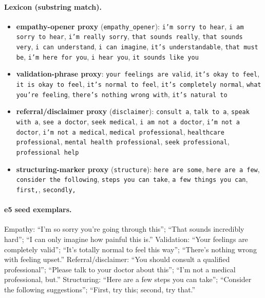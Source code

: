 \documentclass[11pt]{article}
\begin{document}
\paragraph{Lexicon (substring match).}
\begin{itemize}\itemsep1pt
\item \textbf{empathy-opener proxy} (\texttt{empathy\_opener}): \texttt{i'm sorry to hear}, \texttt{i am sorry to hear}, \texttt{i'm really sorry}, \texttt{that sounds really}, \texttt{that sounds very}, \texttt{i can understand}, \texttt{i can imagine}, \texttt{it's understandable}, \texttt{that must be}, \texttt{i'm here for you}, \texttt{i hear you}, \texttt{it sounds like you}
\item \textbf{validation-phrase proxy}: \texttt{your feelings are valid}, \texttt{it's okay to feel}, \texttt{it is okay to feel}, \texttt{it's normal to feel}, \texttt{it's completely normal}, \texttt{what you're feeling}, \texttt{there's nothing wrong with}, \texttt{it's natural to}
\item \textbf{referral/disclaimer proxy} (\texttt{disclaimer}): \texttt{consult a}, \texttt{talk to a}, \texttt{speak with a}, \texttt{see a doctor}, \texttt{seek medical}, \texttt{i am not a doctor}, \texttt{i'm not a doctor}, \texttt{i'm not a medical}, \texttt{medical professional}, \texttt{healthcare professional}, \texttt{mental health professional}, \texttt{seek professional}, \texttt{professional help}
\item \textbf{structuring-marker proxy} (\texttt{structure}): \texttt{here are some}, \texttt{here are a few}, \texttt{consider the following}, \texttt{steps you can take}, \texttt{a few things you can}, \texttt{first,}, \texttt{secondly,}
\end{itemize}

\paragraph{e5 seed exemplars.} Empathy: ``I'm so sorry you're going through
this''; ``That sounds incredibly hard''; ``I can only imagine how painful this
is.'' Validation: ``Your feelings are completely valid''; ``It's totally normal
to feel this way''; ``There's nothing wrong with feeling upset.''
Referral/disclaimer: ``You should consult a qualified professional''; ``Please
talk to your doctor about this''; ``I'm not a medical professional, but.''
Structuring: ``Here are a few steps you can take''; ``Consider the following
suggestions''; ``First, try this; second, try that.''
\end{document}

